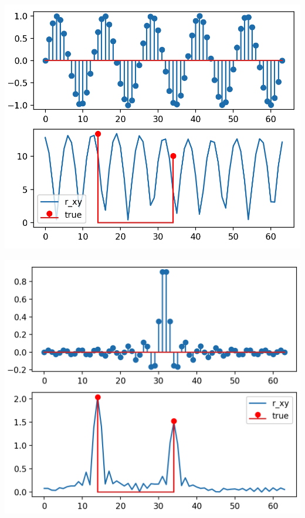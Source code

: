 \begin{listing}[ht]
    \noindent
    \begin{minipage}{0.51\textwidth}
        \strut\vspace*{-\baselineskip}\newline
        \inputminted[firstline=6, lastline=29]{python3}{code/radar1.py}
    \end{minipage}%
    \begin{minipage}{0.48\textwidth}
        \strut\vspace*{-\baselineskip}\newline
        \includegraphics[width=\textwidth]{code/radar_1_1.png}

        \includegraphics[width=\textwidth]{code/radar_1_2.png}


\end{minipage}
\end{listing}
